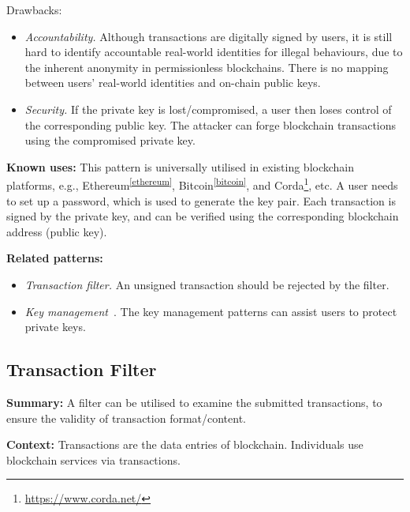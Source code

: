 \documentclass{article}
\begin{document}
Drawbacks: 
\begin{itemize}
   \item \textit{Accountability.} Although transactions are digitally signed by users, it is still hard to identify accountable real-world identities for illegal behaviours, due to the inherent anonymity in permissionless blockchains. There is no mapping between users' real-world identities and on-chain public keys.
   
   \item \textit{Security.} If the private key is lost/compromised, a user then loses control of the corresponding public key. The attacker can forge blockchain transactions using the compromised private key.
\end{itemize}



\vspace{0.5em}\noindent \textbf{Known uses:} This pattern is universally utilised in existing blockchain platforms, e.g., Ethereum\textsuperscript{\ref{ethereum}}, Bitcoin\textsuperscript{\ref{bitcoin}}, and Corda\footnote{\url{https://www.corda.net/}}, etc. A user needs to set up a password, which is used to generate the key pair. Each transaction is signed by the private key, and can be verified using the corresponding blockchain address (public key).


\vspace{0.5em}\noindent \textbf{Related patterns:} 

\begin{itemize}
    \item \textit{Transaction filter.} An unsigned transaction should be rejected by the filter.
    
    \item \textit{Key management}~\cite{SSIpattern}. The key management patterns can assist users to protect private keys.
\end{itemize}



\subsection{Transaction Filter}

\vspace{0.5em}\noindent \textbf{Summary:} A filter can be utilised to examine the submitted transactions, to ensure the validity of transaction format/content.

\vspace{0.5em}\noindent \textbf{Context:} Transactions are the data entries of blockchain. Individuals use blockchain services via transactions.
\end{document}
